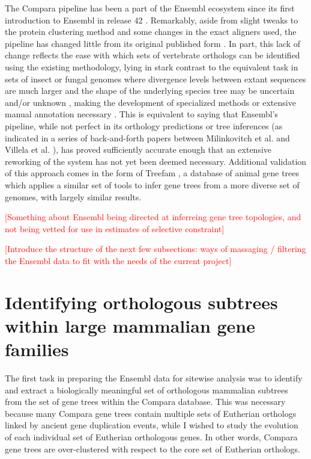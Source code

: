 The Compara pipeline has been a part of the Ensembl ecosystem since
its first introduction to Ensembl in release 42
\citep{Birney2006}. Remarkably, aside from slight tweaks to the
protein clustering method and some changes in the exact aligners used,
the pipeline has changed little from its original published form
\citep{Vilella2009}. In part, this lack of change reflects the ease
with which sets of vertebrate orthologs can be identified using the
existing methodology, lying in stark contrast to the equivalent task
in sets of insect or fungal genomes where divergence levels between
extant sequences are much larger \citep{Siepel2005} and the shape of
the underlying species tree may be uncertain and/or unknown
\citep{MacKenzie2008a}, making the development of specialized methods
or extensive manual annotation necessary
\citep{Kellis2004,Rasmussen2007}. This is equivalent to saying that
Ensembl's pipeline, while not perfect in its orthology predictions or
tree inferences (as indicated in a series of back-and-forth papers
between Milinkovitch et al. \citeyearpar{Milinkovitch2010} and Villela
et al. \citeyearpar{Vilella2011}), has proved sufficiently accurate
enough that an extensive reworking of the system has not yet been
deemed necessary. Additional validation of this approach comes in the
form of Treefam \citep{Ruan2008}, a database of animal gene trees which
applies a similar set of tools to infer gene trees from a more diverse
set of genomes, with largely similar results.

\textcolor{red}{[Something about Ensembl being directed at inferreing
    gene tree topologies, and not being vetted for use in estimates of
    selective constraint]}

\textcolor{red}{[Introduce the structure of the next few subsections:
    ways of massaging / filtering the Ensembl data to fit with the
    needs of the current project]}

\section{Identifying orthologous subtrees within large mammalian gene families}

The first task in preparing the Ensembl data for sitewise analysis was
to identify and extract a biologically meaningful set of orthologous
mammalian subtrees from the set of gene trees within the Compara
database. This was necessary because many Compara gene trees contain
multiple sets of Eutherian orthologs linked by ancient gene
duplication events, while I wished to study the evolution of each
individual set of Eutherian orthologous genes. In other words, Compara
gene trees are over-clustered with respect to the core set of
Eutherian orthologs.

